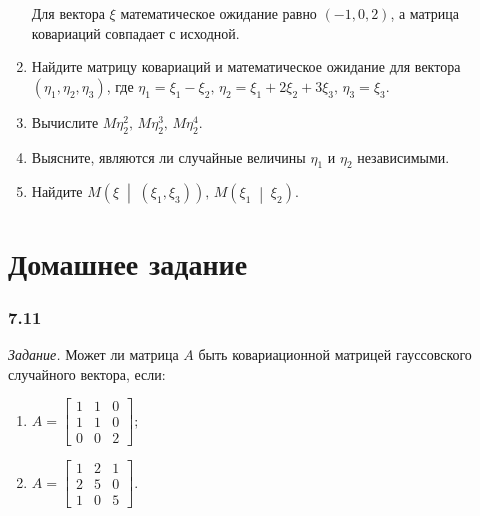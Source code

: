 \begin{enumerate}[label=\alph*)]
  Для вектора $ \xi $ математическое ожидание равно $ \left( -1, 0, 2 \right) $,
  а матрица ковариаций совпадает с исходной.
  \item Найдите матрицу ковариаций и математическое ожидание для вектора
  $ \left( \eta_1, \eta_2, \eta_3 \right) $,
  где $ \eta_1 = \xi_1 - \xi_2, \, \eta_2 = \xi_1 + 2 \xi_2 + 3 \xi_3, \, \eta_3 = \xi_3$.
  \item Вычислите $M \eta_2^2, \, M \eta_2^3, \, M \eta_2^4$.
  \item Выясните, являются ли случайные величины $ \eta_1$ и $ \eta_2$ независимыми.
  \item Найдите
  $M \left( \xi \; \middle| \; \left( \xi_1, \xi_3 \right) \right), \,
    M \left( \xi_1 \; \middle| \; \xi_2 \right) $.
\end{enumerate}


\section*{Домашнее задание}

\subsubsection*{7.11}

\textit{Задание.}
Может ли матрица $A$ быть ковариационной матрицей гауссовского случайного вектора, если:
\begin{enumerate}[label=\alph*)]
  \item $A =
    \begin{bmatrix}
      1 & 1 & 0 \\
      1 & 1 & 0 \\
      0 & 0 & 2
    \end{bmatrix};$
  \item $A =
    \begin{bmatrix}
      1 & 2 & 1 \\
      2 & 5 & 0 \\
      1 & 0 & 5
    \end{bmatrix}.$
\end{enumerate}


